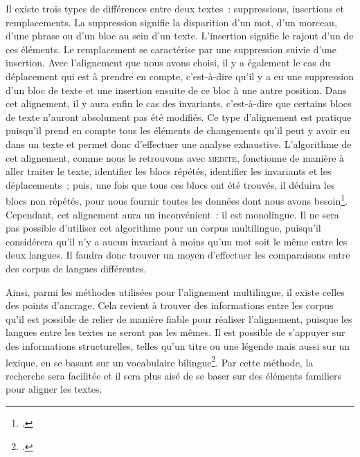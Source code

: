 Il existe trois types de différences entre deux textes~: suppressions, insertions et remplacements. La suppression signifie la disparition d'un mot, d'un morceau, d'une phrase ou d'un bloc au sein d'un texte. L'insertion signifie le rajout d'un de ces éléments. Le remplacement se caractérise par une suppression suivie d'une insertion. Avec l'alignement que nous avons choisi, il y a également le cas du déplacement qui est à prendre en compte, c'est-à-dire qu'il y a eu une suppression d'un bloc de texte et une insertion ensuite de ce bloc à une autre position. Dans cet alignement, il y aura enfin le cas des invariants, c'est-à-dire que certains blocs de texte n'auront absolument pas été modifiés. Ce type d'alignement est pratique puisqu'il prend en compte tous les éléments de changements qu'il peut y avoir eu dans un texte et permet donc d'effectuer une analyse exhaustive. L'algorithme de cet alignement, comme nous le retrouvons avec \textsc{medite}, fonctionne de manière à aller traiter le texte, identifier les blocs répétés, identifier les invariants et les déplacements~; puis, une fois que tous ces blocs ont été trouvés, il déduira les blocs non répétés, pour nous fournir toutes les données dont nous avons besoin\footcite{alignement_monolingues_bourdaillet_ganascia}. Cependant, cet alignement aura un inconvénient~: il est monolingue. Il ne sera pas possible d'utiliser cet algorithme pour un corpus multilingue, puisqu'il considérera qu'il n'y a aucun invariant à moins qu'un mot soit le même entre les deux langues. Il faudra donc trouver un moyen d'effectuer les comparaisons entre des corpus de langues différentes.

Ainsi, parmi les méthodes utilisées pour l'alignement multilingue, il existe celles des points d'ancrage. Cela revient à trouver des informations entre les corpus qu'il est possible de relier de manière fiable pour réaliser l'alignement, puisque les langues entre les textes ne seront pas les mêmes. Il est possible de s'appuyer sur des informations structurelles, telles qu'un titre ou une légende mais aussi sur un lexique, en se basant sur un vocabulaire bilingue\footcite[p.~9-10]{alignement_prochasson}. Par cette méthode, la recherche sera facilitée et il sera plus aisé de se baser sur des éléments familiers pour aligner les textes.

